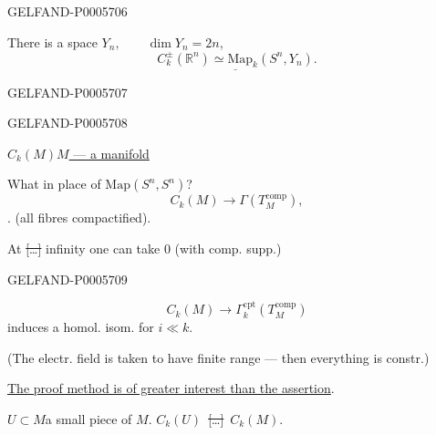\begin{GelfandAdjacentEvidence}{GELFAND-P000570}{6}

There is a space \(Y_n,\qquad\dim Y_n=2n\),
\[
\underline{C_k^\pm(\mathbb R^n)\simeq\mathrm{Map}_k(S^n,Y_n)}.
\]
\end{GelfandAdjacentEvidence}
\begin{GelfandAdjacentEvidence}{GELFAND-P000570}{7}

\end{GelfandAdjacentEvidence}
\begin{GelfandAdjacentEvidence}{GELFAND-P000570}{8}

\underline{\(C_k(M)\)}\qquad \underline{\(M\) — a manifold}

What in place of \(\mathrm{Map}(S^n,S^n)\)?
\[
C_k(M)\longrightarrow\Gamma(T_M^{\mathrm{comp}}),
\]
. (all fibres compactified).

At \sout{[…]} infinity one can take \(0\) (with comp. supp.)
\end{GelfandAdjacentEvidence}
\begin{GelfandAdjacentEvidence}{GELFAND-P000570}{9}

\[
C_k(M)\longrightarrow\Gamma_k^{\mathrm{cpt}}(T_M^{\mathrm{comp}})
\]
induces a homol. isom. for \(i\ll k\).

(The electr. field is taken to have finite range — then everything is constr.)

\uline{The proof method is of greater interest than the assertion}.

\(U\subset M\)\quad a small piece of \(M\).
\qquad \(C_k(U)\)\ \sout{[…]}\ \(C_k(M)\).
\end{GelfandAdjacentEvidence}
